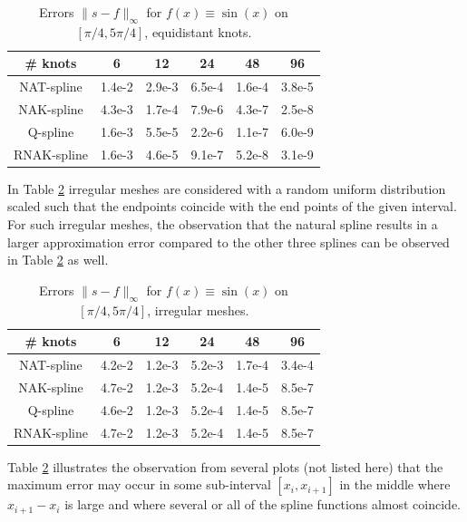\documentclass[12pt]{article}
\begin{document}

\vfill


\begin{table}[!h]
\centering
\begin{tabular}{| c| c| c| c| c| c|} 
 \hline
 \# knots & 6 & 12 & 24 & 48 & 96 \\ [0.5ex] 
 \hline\hline
 NAT-spline & 1.4e-2  & 2.9e-3 & 6.5e-4 & 1.6e-4 & 3.8e-5  \\
 NAK-spline & 4.3e-3  & 1.7e-4 & 7.9e-6 & 4.3e-7 & 2.5e-8  \\
 Q-spline   & 1.6e-3  & 5.5e-5 & 2.2e-6 & 1.1e-7 & 6.0e-9  \\
 RNAK-spline& 1.6e-3  & 4.6e-5 & 9.1e-7 & 5.2e-8 & 3.1e-9  \\
 \hline
\end{tabular}
\caption{Errors $\|s-f \|_\infty$ for $f(x)\equiv \sin(x)$ on $[\pi/4,5\pi/4]$, equidistant knots.}
\label{table:2}
\end{table}

In Table  \ref{table:3} irregular meshes are considered
with a random uniform distribution scaled such that the endpoints coincide
with the end points of the given interval.
For such irregular meshes, the observation that the natural spline results in a
larger approximation error compared to the other three splines
can be observed in Table \ref{table:3} as well.

\vfill


\begin{table}[!h]
\centering
\begin{tabular}{| c| c| c| c| c| c|} 
 \hline
 \# knots & 6 & 12 & 24 & 48 & 96 \\ [0.5ex] 
 \hline\hline
 NAT-spline & 4.2e-2 & 1.2e-3 & 5.2e-3 & 1.7e-4 & 3.4e-4  \\
 NAK-spline & 4.7e-2 & 1.2e-3 & 5.2e-4 & 1.4e-5 & 8.5e-7  \\
 Q-spline   & 4.6e-2 & 1.2e-3 & 5.2e-4 & 1.4e-5 & 8.5e-7  \\
 RNAK-spline& 4.7e-2 & 1.2e-3 & 5.2e-4 & 1.4e-5 & 8.5e-7  \\
 \hline
\end{tabular}
\caption{Errors $\|s-f \|_\infty$ for $f(x)\equiv \sin(x)$ on $[\pi/4,5\pi/4]$, irregular meshes.}
\label{table:3}
\end{table}

Table \ref{table:3} illustrates the observation from several plots
(not listed here) 
that the maximum error may occur in some sub-interval
$[x_i,x_{i+1}]$ in the middle where $x_{i+1}-x_i$ is large 
and where several or all of the
spline functions almost coincide.
\end{document}
